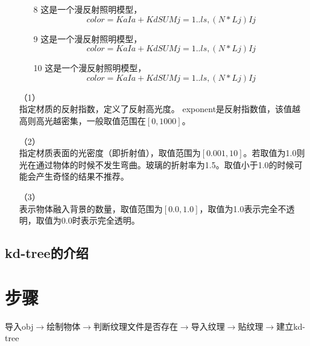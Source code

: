 \documentclass[10pt]{article}
\begin{document}
\begin{itemize}
\begin{itemize}
\item[8]{这是一个漫反射照明模型，}
$$color=KaIa+ Kd { SUM j=1..ls, (N * Lj)Ij }$$

\item[9]{这是一个漫反射照明模型，}
$$color=KaIa+ Kd { SUM j=1..ls, (N * Lj)Ij }$$

\item[10]{ 这是一个漫反射照明模型，}
$$color=KaIa+ Kd { SUM j=1..ls, (N * Lj)Ij }$$
\end{itemize}


\item[（1）]{}\\
指定材质的反射指数，定义了反射高光度。 exponent是反射指数值，该值越高则高光越密集，一般取值范围在$[0,1000]$。 

\item[（2）]{} \\
指定材质表面的光密度（即折射值），取值范围为$[0.001,10]$。若取值为1.0则光在通过物体的时候不发生弯曲。玻璃的折射率为1.5。取值小于1.0的时候可能会产生奇怪的结果不推荐。

\item[（3）]{}\\
表示物体融入背景的数量，取值范围为$[0.0,1.0]$，取值为1.0表示完全不透明，取值为0.0时表示完全透明。

\end{itemize}


\subsection{kd-tree的介绍}


\section{步骤}
导入obj$\to$绘制物体$\to$判断纹理文件是否存在$\to$导入纹理$\to$贴纹理$\to$建立kd-tree
\end{document}
